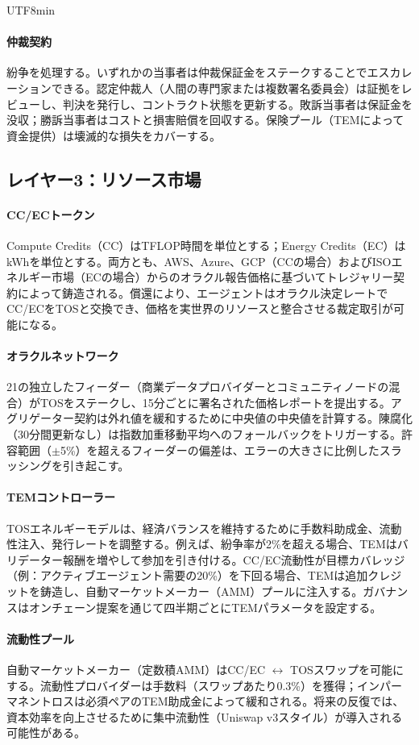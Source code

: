 \documentclass[11pt]{article}
\begin{document}
\begin{CJK}{UTF8}{min}
\paragraph{仲裁契約} 紛争を処理する。いずれかの当事者は仲裁保証金をステークすることでエスカレーションできる。認定仲裁人（人間の専門家または複数署名委員会）は証拠をレビューし、判決を発行し、コントラクト状態を更新する。敗訴当事者は保証金を没収；勝訴当事者はコストと損害賠償を回収する。保険プール（TEMによって資金提供）は壊滅的な損失をカバーする。

\subsection{レイヤー3：リソース市場}
\paragraph{CC/ECトークン} Compute Credits（CC）はTFLOP時間を単位とする；Energy Credits（EC）はkWhを単位とする。両方とも、AWS、Azure、GCP（CCの場合）およびISOエネルギー市場（ECの場合）からのオラクル報告価格に基づいてトレジャリー契約によって鋳造される。償還により、エージェントはオラクル決定レートでCC/ECをTOSと交換でき、価格を実世界のリソースと整合させる裁定取引が可能になる。

\paragraph{オラクルネットワーク} 21の独立したフィーダー（商業データプロバイダーとコミュニティノードの混合）がTOSをステークし、15分ごとに署名された価格レポートを提出する。アグリゲーター契約は外れ値を緩和するために中央値の中央値を計算する。陳腐化（30分間更新なし）は指数加重移動平均へのフォールバックをトリガーする。許容範囲（$\pm$5\%）を超えるフィーダーの偏差は、エラーの大きさに比例したスラッシングを引き起こす。

\paragraph{TEMコントローラー} TOSエネルギーモデルは、経済バランスを維持するために手数料助成金、流動性注入、発行レートを調整する。例えば、紛争率が2\%を超える場合、TEMはバリデーター報酬を増やして参加を引き付ける。CC/EC流動性が目標カバレッジ（例：アクティブエージェント需要の20\%）を下回る場合、TEMは追加クレジットを鋳造し、自動マーケットメーカー（AMM）プールに注入する。ガバナンスはオンチェーン提案を通じて四半期ごとにTEMパラメータを設定する。

\paragraph{流動性プール} 自動マーケットメーカー（定数積AMM）はCC/EC $\leftrightarrow$ TOSスワップを可能にする。流動性プロバイダーは手数料（スワップあたり0.3\%）を獲得；インパーマネントロスは必須ペアのTEM助成金によって緩和される。将来の反復では、資本効率を向上させるために集中流動性（Uniswap v3スタイル）が導入される可能性がある。


\end{CJK}
\end{document}
